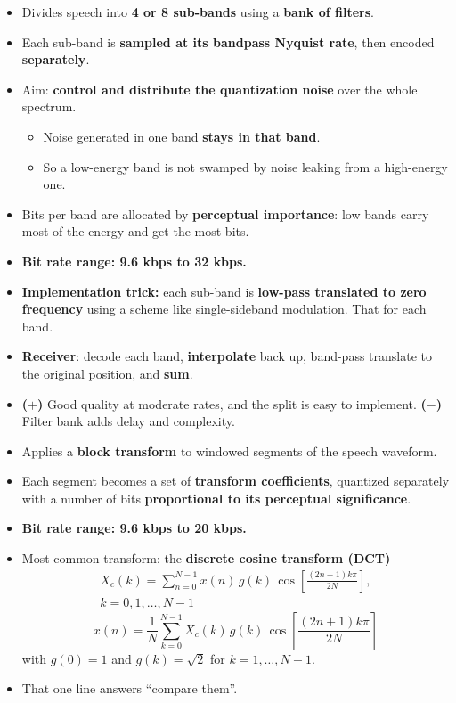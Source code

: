 \begin{itemize}
  \item Divides speech into \textbf{4 or 8 sub-bands} using a \textbf{bank of filters}.
  \item Each sub-band is \textbf{sampled at its bandpass Nyquist rate}, then encoded
        \textbf{separately}.
  \item Aim: \textbf{control and distribute the quantization noise} over the whole spectrum.
  \begin{itemize}
    \item Noise generated in one band \textbf{stays in that band}.
    \item So a low-energy band is not swamped by noise leaking from a high-energy one.
  \end{itemize}
  \item Bits per band are allocated by \textbf{perceptual importance}: low bands carry most of the
        energy and get the most bits.
  \item \textbf{Bit rate range: 9.6 kbps to 32 kbps.}
  \item \textbf{Implementation trick:} each sub-band is \textbf{low-pass translated to zero
        frequency} using a scheme like single-sideband modulation. That
         for each band.
  \item \textbf{Receiver}: decode each band, \textbf{interpolate} back up, band-pass translate to
        the original position, and \textbf{sum}.
  \item \textbf{($+$)} Good quality at moderate rates, and the split is easy to implement.
        \textbf{($-$)} Filter bank adds delay and complexity.
\end{itemize}

\begin{itemize}
  \item Applies a \textbf{block transform} to windowed segments of the speech waveform.
  \item Each segment becomes a set of \textbf{transform coefficients}, quantized separately with a
        number of bits \textbf{proportional to its perceptual significance}.
  \item \textbf{Bit rate range: 9.6 kbps to 20 kbps.}
  \item Most common transform: the \textbf{discrete cosine transform (DCT)}
        \[ \begin{gathered} X_c(k) = \sum_{n=0}^{N-1} x(n)\,g(k)\,
           \cos\!\left[\frac{(2n+1)k\pi}{2N}\right], \\
           k = 0,1,\dots,N-1 \end{gathered} \]
        \[ x(n) = \frac{1}{N}\sum_{k=0}^{N-1} X_c(k)\,g(k)\,
           \cos\!\left[\frac{(2n+1)k\pi}{2N}\right] \]
        with $g(0)=1$ and $g(k)=\sqrt{2}$ for $k = 1,\dots,N-1$.
  \item {} That one line answers
        ``compare them''.
\end{itemize}

